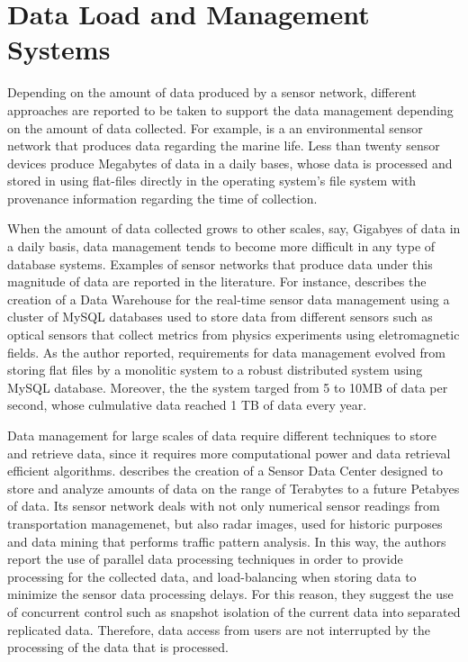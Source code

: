 \section{Data Load and Management Systems}
\label{sec:data-load}

Depending on the amount of data produced by a sensor network, different
approaches are reported to be taken to support the data management depending on
the amount of data collected. For example, \cite{sfbeams2006} is a an
environmental sensor network that produces data regarding the marine life.
Less than twenty sensor devices produce Megabytes of data in a daily bases,
whose data is processed and stored in using flat-files directly in the
operating system's file system with provenance information regarding the time
of collection.

When the amount of data collected grows to other scales, say, Gigabyes of data
in a daily basis, data management tends to become more difficult in any type of
database systems. Examples of sensor networks that produce data under this
magnitude of data are reported in the literature. For instance, 
\cite{sn-dataware-house} describes the creation of a Data Warehouse for the
real-time sensor data management using a cluster of MySQL databases used to
store data from different sensors such as optical sensors that collect metrics
from physics experiments using eletromagnetic fields. As the author reported,
requirements for data management evolved from storing flat files by a
monolitic system to a robust distributed system using MySQL database.
Moreover, the the system targed from 5 to 10MB of data per second, whose
culmulative data reached 1 TB of data every year.

Data management for large scales of data require different techniques to store
and retrieve data, since it requires more computational power and data
retrieval efficient algorithms. \cite{sn-data-center} describes the creation of
a Sensor Data Center designed to store and analyze amounts of data on the range of
Terabytes to a future Petabyes of data. Its sensor network deals with not only
numerical sensor readings from transportation managemenet, but also radar
images, used for historic purposes and data mining that performs traffic
pattern analysis. In this way, the authors report the use of parallel data
processing techniques in order to provide processing for the collected
data, and load-balancing when storing data to minimize the sensor data
processing delays. For this reason, they suggest the use of concurrent control
such as snapshot isolation of the current data into separated replicated data.
Therefore, data access from users are not interrupted by the processing of
the data that is processed.

